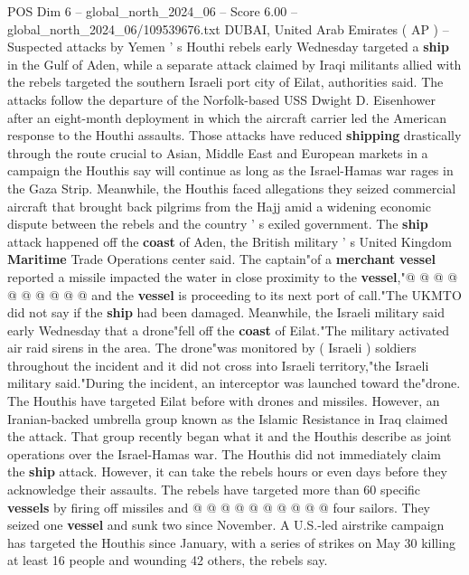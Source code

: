 \begin{textsample}{POS Dim 6 – global\_north\_2024\_06 – Score 6.00 – global\_north\_2024\_06/109539676.txt}  \label{ex:f6_pos_147}
DUBAI, United Arab Emirates ( AP ) -- Suspected attacks by Yemen ' s Houthi rebels early Wednesday targeted a \textbf{ship} in the Gulf of Aden, while a separate attack claimed by Iraqi militants allied with the rebels targeted the southern Israeli port city of Eilat, authorities said.
The attacks follow the departure of the Norfolk-based USS Dwight D.
Eisenhower after an eight-month deployment in which the aircraft carrier led the American response to the Houthi assaults.
Those attacks have reduced \textbf{shipping} drastically through the route crucial to Asian, Middle East and European markets in a campaign the Houthis say will continue as long as the Israel-Hamas war rages in the Gaza Strip.
Meanwhile, the Houthis faced allegations they seized commercial aircraft that brought back pilgrims from the Hajj amid a widening economic dispute between the rebels and the country ' s exiled government.
The \textbf{ship} attack happened off the \textbf{coast} of Aden, the British military ' s United Kingdom \textbf{Maritime} Trade Operations center said.
The captain"of a \textbf{merchant} \textbf{vessel} reported a missile impacted the water in close proximity to the \textbf{vessel},"@ @ @ @ @ @ @ @ @ @ and the \textbf{vessel} is proceeding to its next port of call."The UKMTO did not say if the \textbf{ship} had been damaged.
Meanwhile, the Israeli military said early Wednesday that a drone"fell off the \textbf{coast} of Eilat."The military activated air raid sirens in the area.
The drone"was monitored by ( Israeli ) soldiers throughout the incident and it did not cross into Israeli territory,"the Israeli military said."During the incident, an interceptor was launched toward the"drone.
The Houthis have targeted Eilat before with drones and missiles.
However, an Iranian-backed umbrella group known as the Islamic Resistance in Iraq claimed the attack.
That group recently began what it and the Houthis describe as joint operations over the Israel-Hamas war.
The Houthis did not immediately claim the \textbf{ship} attack.
However, it can take the rebels hours or even days before they acknowledge their assaults.
The rebels have targeted more than 60 specific \textbf{vessels} by firing off missiles and @ @ @ @ @ @ @ @ @ @ four sailors.
They seized one \textbf{vessel} and sunk two since November.
A U.S.-led airstrike campaign has targeted the Houthis since January, with a series of strikes on May 30 killing at least 16 people and wounding 42 others, the rebels say.

\end{textsample}
